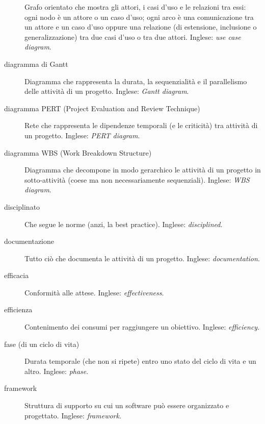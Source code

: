 \documentclass[a4paper]{article}
\begin{document}
\begin{description}
			Grafo orientato che mostra gli attori, i casi d'uso e le relazioni tra essi: ogni nodo è un attore o un caso d'uso; ogni arco è una comunicazione tra un attore e un caso d'uso oppure una relazione (di estensione, inclusione o generalizzazione) tra due casi d'uso o tra due attori. Inglese: \emph{use case diagram}.
			
	\item[diagramma di Gantt] 

			Diagramma che rappresenta la durata, la sequenzialità e il parallelismo delle attività di un progetto. Inglese: \emph{Gantt diagram}.
			
	\item[diagramma PERT (Project Evaluation and Review Technique)] 

			Rete che rappresenta le dipendenze temporali (e le criticità) tra attività di un progetto. Inglese: \emph{PERT diagram}.
			
	\item[diagramma WBS (Work Breakdown Structure)] 

			Diagramma che decompone in modo gerarchico le attività di un progetto in sotto-attività (coese ma non necessariamente sequenziali). Inglese: \emph{WBS diagram}.
			
	\item[disciplinato] 

			Che segue le norme (anzi, la best practice). Inglese: \emph{disciplined}.
			
	\item[documentazione] 

			Tutto ciò che documenta le attività di un progetto. Inglese: \emph{documentation}.
			
	\item[efficacia] 

			Conformità alle attese. Inglese: \emph{effectiveness}.
			
	\item[efficienza] 

			Contenimento dei consumi per raggiungere un obiettivo. Inglese: \emph{efficiency}.
			
	\item[fase (di un ciclo di vita)] 

			Durata temporale (che non si ripete) entro uno stato del ciclo di vita e un altro. Inglese: \emph{phase}.
			
	\item[framework] 

			Struttura di supporto su cui un software può essere organizzato e progettato. Inglese: \emph{framework}.
			

\end{description}
\end{document}
